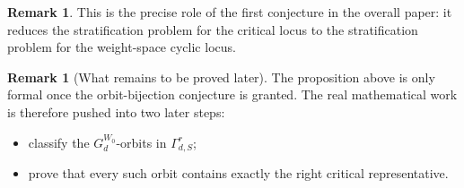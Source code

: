 \documentclass{article}
\theoremstyle{definition}
\newtheorem{remark}[theorem]{Remark}
\begin{document}
\begin{remark}
This is the precise role of the first conjecture in the overall paper: it reduces the stratification problem for the critical locus to the stratification problem for the weight-space cyclic locus.
\end{remark}

\begin{remark}[What remains to be proved later]
The proposition above is only formal once the orbit-bijection conjecture is granted. The real mathematical work is therefore pushed into two later steps:
\begin{itemize}
\item classify the $G_d^{W_0}$-orbits in $\Gamma_{d,S}^r$;
\item prove that every such orbit contains exactly the right critical representative.
\end{itemize}
\end{remark}
\end{document}
